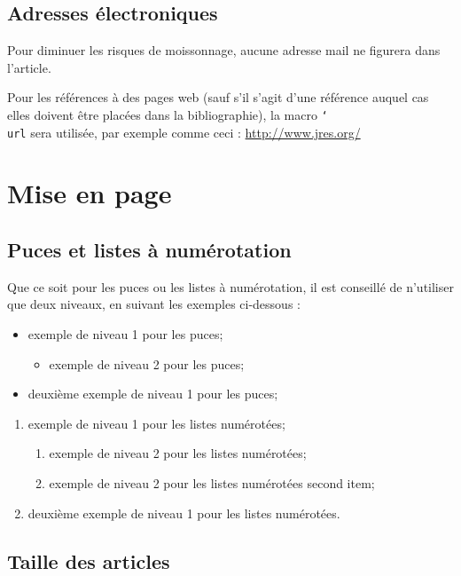 \documentclass[city=Montpellier,year=2015]{jres}
\begin{document}
\subsection{Adresses électroniques}

Pour diminuer les risques de moissonnage, aucune adresse mail ne
figurera dans l'article. 

Pour les références à des pages web (sauf s'il s'agit d'une référence
auquel cas elles doivent être placées dans la bibliographie), la macro
\texttt{\char`\\url} sera utilisée, par exemple comme ceci :
\url{http://www.jres.org/}

\section{Mise en page}

\subsection{Puces et listes à numérotation}

Que ce soit pour les puces ou les listes à 
numérotation, il est conseillé de n'utiliser que deux niveaux, en
suivant les exemples ci-dessous :

\begin{itemize}
\item exemple de niveau 1 pour les puces;
\begin{itemize}
\item exemple de niveau 2 pour les puces;
\end{itemize}
\item deuxième exemple de niveau 1 pour les puces;
\end{itemize}
\begin{enumerate}
\item exemple de niveau 1 pour les listes numérotées;
\begin{enumerate}
\item exemple de niveau 2 pour les listes numérotées;
\item exemple de niveau 2 pour les listes numérotées second item;
\end{enumerate}
\item deuxième exemple de niveau 1 pour les listes numérotées.
\end{enumerate}

\subsection{Taille des articles}
\end{document}
